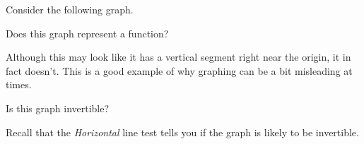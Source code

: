 \documentclass{ximera}
\begin{document}
\begin{problem}
    Consider the following graph.
    \begin{center}
    \end{center}
    
    Does this graph represent a function?
    \begin{multipleChoice}
    \end{multipleChoice}
    \begin{feedback}
        Although this may look like it has a vertical segment right near the origin, it in fact doesn't. This is a good example of why graphing can be a bit misleading at times.
    \end{feedback}
    
    \begin{problem}
        Is this graph invertible?
        \begin{multipleChoice}
            \begin{feedback}
                Recall that the \textit{Horizontal} line test tells you if the graph is likely to be invertible.
            \end{feedback}
        \end{multipleChoice}
    \end{problem}
\end{problem}
\end{document}
